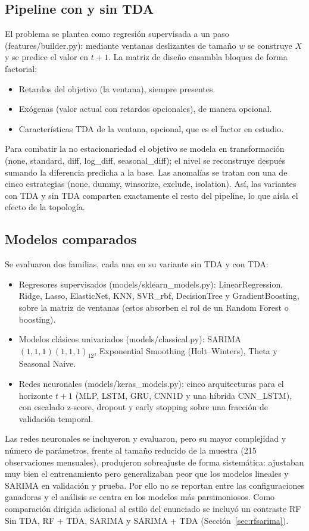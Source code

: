\documentclass[11pt,a4paper]{article}
\begin{document}
\subsection{Pipeline con y sin TDA}
El problema se plantea como regresión supervisada a un paso (features/builder.py):
mediante ventanas deslizantes de tamaño $w$ se construye $X$ y se predice el
valor en $t{+}1$. La matriz de diseño ensambla bloques de forma factorial:
\begin{itemize}[noitemsep]
  \item Retardos del objetivo (la ventana), siempre presentes.
  \item Exógenas (valor actual con retardos opcionales), de manera opcional.
  \item Características TDA de la ventana, opcional, que es el factor en estudio.
\end{itemize}
Para combatir la no estacionariedad el objetivo se modela en transformación
(none, standard, diff, log\_diff, seasonal\_diff); el nivel se reconstruye
después sumando la diferencia predicha a la base. Las anomalías se tratan con una
de cinco estrategias (none, dummy, winsorize, exclude, isolation). Así, las
variantes con TDA y sin TDA comparten exactamente el resto del pipeline, lo que
aísla el efecto de la topología.

\subsection{Modelos comparados}
Se evaluaron dos familias, cada una en su variante sin TDA y con TDA:
\begin{itemize}[noitemsep]
  \item Regresores supervisados (models/sklearn\_models.py): LinearRegression,
        Ridge, Lasso, ElasticNet, KNN, SVR\_rbf, DecisionTree y
        GradientBoosting, sobre la matriz de ventanas (estos absorben el rol de
        un Random Forest o boosting).
  \item Modelos clásicos univariados (models/classical.py):
        SARIMA$(1,1,1)(1,1,1)_{12}$, Exponential Smoothing (Holt--Winters),
        Theta y Seasonal Naive.
  \item Redes neuronales (models/keras\_models.py): cinco arquitecturas para el
        horizonte $t{+}1$ (MLP, LSTM, GRU, CNN1D y una híbrida CNN\_LSTM), con
        escalado z-score, dropout y early stopping sobre una fracción de
        validación temporal.
\end{itemize}
Las redes neuronales se incluyeron y evaluaron, pero su mayor complejidad y
número de parámetros, frente al tamaño reducido de la muestra (215 observaciones
mensuales), produjeron sobreajuste de forma sistemática: ajustaban muy bien el
entrenamiento pero generalizaban peor que los modelos lineales y SARIMA en
validación y prueba. Por ello no se reportan entre las configuraciones ganadoras
y el análisis se centra en los modelos más parsimoniosos.
Como comparación dirigida adicional al estilo del enunciado se incluyó un
contraste RF Sin TDA, RF + TDA, SARIMA y SARIMA + TDA
(Sección~\ref{sec:rfsarima}).
\end{document}
